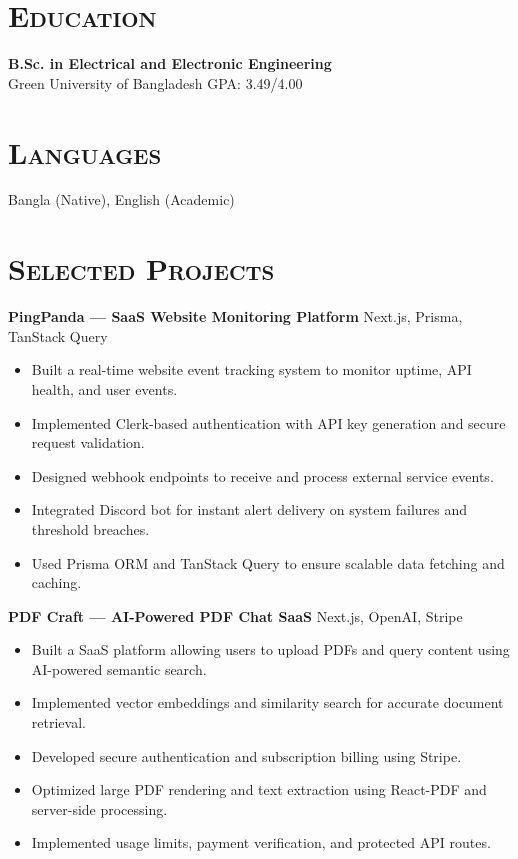 \documentclass[11pt]{article}
\begin{document}
\section*{\scshape Education}
\textbf{B.Sc. in Electrical and Electronic Engineering} \\Green University of Bangladesh \hfill GPA: 3.49/4.00

\section*{\scshape Languages}
Bangla (Native), English (Academic)

\section*{\scshape Selected Projects}
\textbf{PingPanda — SaaS Website Monitoring Platform} \hfill Next.js, Prisma, TanStack Query\\
\begin{itemize}[left=0pt]
	\item Built a real-time website event tracking system to monitor uptime, API health, and user events.
	\item Implemented Clerk-based authentication with API key generation and secure request validation.
	\item Designed webhook endpoints to receive and process external service events.
	\item Integrated Discord bot for instant alert delivery on system failures and threshold breaches.
	\item Used Prisma ORM and TanStack Query to ensure scalable data fetching and caching.
\end{itemize}
\vspace{8pt}

\textbf{PDF Craft — AI-Powered PDF Chat SaaS} \hfill Next.js, OpenAI, Stripe\\
\begin{itemize}
	\item Built a SaaS platform allowing users to upload PDFs and query content using AI-powered semantic search.
	\item Implemented vector embeddings and similarity search for accurate document retrieval.
	\item Developed secure authentication and subscription billing using Stripe.
	\item Optimized large PDF rendering and text extraction using React-PDF and server-side processing.
	\item Implemented usage limits, payment verification, and protected API routes.
\end{itemize}
\vspace{8pt}
\end{document}

